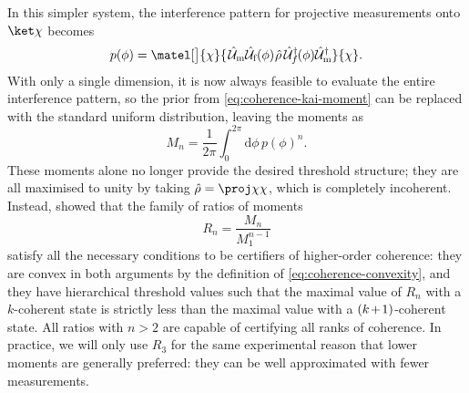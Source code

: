 In this simpler system, the interference pattern for projective measurements onto $\ket\chi$ becomes
\begin{equation}\label{eq:coherence-interference-pattern-projector}
p(\phi) = \matel[\big]{\chi}{\mkern2mu\U_{\text m}\U_{\text f}(\phi)\mkern1mu\op\rho\mkern3mu\U_{\smash f}^\dagger\mkern-1mu(\phi)\U_{\text m}^\dagger}{\chi}.
\end{equation}
With only a single dimension, it is now always feasible to evaluate the entire interference pattern, so the prior from \cref{eq:coherence-kai-moment} can be replaced with the standard uniform distribution, leaving the moments as
\begin{equation}\label{eq:coherence-moment}
M_n = \frac1{2\pi}\int_0^{2\pi}\!\mathrm d\phi\,p(\phi)^n.
\end{equation}
These moments alone no longer provide the desired threshold structure; they are all maximised to unity by taking $\op\rho = \proj\chi\chi$, which is completely incoherent.
Instead, \citet{Dive2020} showed that the family of ratios of moments
\begin{equation}\label{eq:coherence-rn}
R_n = \frac{M_n}{M_1^{n-1}}
\end{equation}
satisfy all the necessary conditions to be certifiers of higher-order coherence: they are convex in both arguments by the definition of \cref{eq:coherence-convexity}, and they have hierarchical threshold values such that the maximal value of $R_n$ with a $k$-coherent state is strictly less than the maximal value with a $\msquash{(k+1)}$-coherent state.
All ratios with $n>2$ are capable of certifying all ranks of coherence.
In practice, we will only use $R_3$ for the same experimental reason that lower moments are generally preferred: they can be well approximated with fewer measurements.

